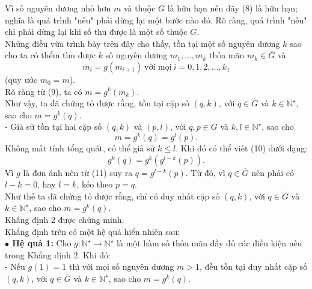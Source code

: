 Vì số nguyên dương nhỏ hơn $m$ và thuộc $G$ là hữu hạn nên dãy (8) là hữu hạn; nghĩa là quá trình "nếu" phải dừng lại một bước nào đó. Rõ ràng, quá trình "nếu" chỉ phải dừng lại khi số thu được là một số thuộc $\overline{G}$.\\
Những điều vừa trình bày trên đây cho thấy, tồn tại một số nguyên dương $k$ sao cho ta có thểm tìm được $k$ số nguyên dương $m_1,\ldots,m_k$ thỏa mãn $m_k\in \overline{G}$ và \[m_i=g(m_{i+1})\ \text{với mọi}\ i=0,1,2 ,\ldots, k_1 \tag{9}\]
(quy ước $m_0=m$).\\
Rõ ràng từ (9), ta có $m=g^k(m_k)$.\\
Như vậy, ta đã chứng tỏ được rằng, tồn tại cặp số $(q,k)$, với $q\in\overline{G}$ và $k\in \mathbb{N}^\star$, sao cho $m=g^k(q)$.\\
- Giả sử tồn tại hai cặp số $(q,k)$ và $(p,l)$, với $q,p\in\overline{G}$ và $k,l\in \mathbb{N}^\star$, sao cho \[m=g^k(q)=g^l(p). \tag{10}\]  
Không mất tính tổng quát, có thể giả sử $k\le l$. Khi đó có thể viết (10) dưới dạng: \[g^k(q)=g^k(g^{l-k}(p)).\tag{11}\]
Vì $g$ là đơn ánh nên từ (11) suy ra $q=g^{l-k}(p)$. Từ đó, vì $q\in\overline{G}$ nên phải có $l-k=0$, hay $l=k$, kéo theo $p=q$.\\
Như thế ta đã chứng tỏ được rằng, chỉ có duy nhất cặp số $(q,k)$, với $q\in \overline{G}$ và $k\in\mathbb{N}^\star$, sao cho $m=g^k(q)$.\\
Khẳng định 2 được chứng minh.\\
Khẳng định trên có một hệ quả hiển nhiên sau:\\
{\bf$\bullet$ Hệ quả 1:} Cho $g: \mathbb{N}^\star\longrightarrow\mathbb{N}^\star$ là một hàm số thỏa mãn đầy đủ các điều kiện nêu trong Khẳng định 2. Khi đó:\\
- Nếu $g(1)=1$ thì với mọi số nguyên dương $m>1$, đều tồn tại duy nhất cặp số $(q,k)$, với $q\in \overline{G}$ và $k\in\mathbb{N}^\star$, sao cho $m=g^k(q)$.

